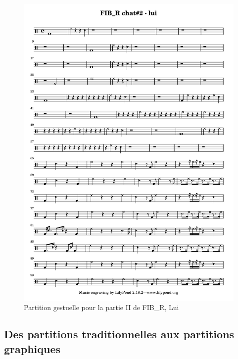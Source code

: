 \begin{figure}[!htbp]
	\includegraphics[width=\textwidth]{gfx/notation/FIBR-Chat2-Lui.pdf}
	\caption{Partition gestuelle pour la partie II de FIB\_R, Lui}
	\label{fig:notation:FIBR-chat2-Lui}
\end{figure}


\subsection{Des partitions traditionnelles aux partitions graphiques}

